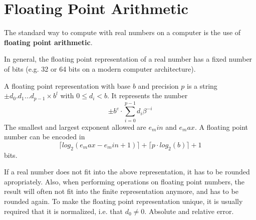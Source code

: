 \section{Floating Point Arithmetic}
The standard way to compute with real numbers on a computer is the use 
of \textbf{floating point arithmetic}. 

In general, the floating point representation of a real number has a fixed number of bits (e.g. 32 or 64 bits on a modern computer architecture).
\begin{definition}\label{def: floating point number}
	A floating point representation with base $b$ and precision $p$
	is a string $\pm d_0 . d_1 \dots d_{p-1} \times b^l$ with $0 \leq d_i < b$.	
	It represents the number
	$$ \pm b^e \cdot \sum_{i=0}^{p-1} d_i\beta^{-i} $$ 
	The smallest and largest exponent allowed are $e_min$ and $e_max$.
	A floating point number can be encoded in
	$$ \lceil log_2(e_max-e_min+1) \rceil + \lceil  p \cdot log_2 (b) \rceil + 1 $$
	bits.
\end{definition}
If a real number does not fit into the above representation, it has to be rounded apropriately.
Also, when performing operations on floating point numbers, the result will often not fit into the finite representation anymore, 
and has to be rounded again.
To make the floating point representation unique, it is usually required that it is normalized, i.e. that $d_0 \neq 0$.
Absolute and relative error.

